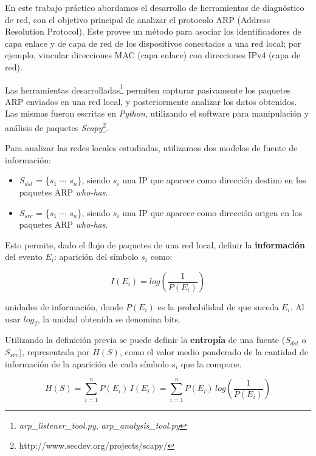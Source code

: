 En este trabajo práctico abordamos el desarrollo de herramientas de diagnóstico de red, con el objetivo principal de analizar el protocolo ARP (Address Resolution Protocol). Este provee un método para asociar los identificadores de capa enlace y de capa de red de los dispositivos conectados a una red local; por ejemplo, vincular direcciones MAC (capa enlace) con direcciones IPv4 (capa de red).

Las herramientas desarrolladas\footnote{\emph{arp\_listener\_tool.py}, \emph{arp\_analysis\_tool.py}} permiten capturar pasivamente los paquetes ARP enviados en una red local, y posteriormente analizar los datos obtenidos. Las mismas fueron escritas en \emph{Python}, utilizando el software para manipulación y análisis de paquetes \emph{Scapy}\footnote{http://www.secdev.org/projects/scapy/}.

Para analizar las redes locales estudiadas, utilizamos dos modelos de fuente de información:
\vspace*{-2mm}

\begin{itemize}
  \item $S_{dst}$ = \{$s_1$ $\cdots$ $s_n$\}, siendo $s_i$ una IP que aparece como dirección destino en los paquetes ARP \emph{who-has}.
  \item $S_{src}$ = \{$s_1$ $\cdots$ $s_n$\}, siendo $s_i$ una IP que aparece como dirección origen en los paquetes ARP \emph{who-has}.
\end{itemize}

Esto permite, dado el flujo de paquetes de una red local, definir la \textbf{información} del evento $E_i$: aparición del símbolo $s_i$ como:

$$I (E_i) = log\left(\frac{1}{P(E_i)}\right)$$

unidades de información, donde $P(E_i)$ es la probabilidad de que suceda $E_i$. Al usar $log_2$, la unidad obtenida se denomina bits.

Utilizando la definición previa se puede definir la \textbf{entropía} de una fuente ($S_{dst}$ o $S_{src}$), representada por $H(S)$, como el valor medio ponderado de la cantidad de información de la aparición de cada símbolo $s_i$ que la compone.

$$H(S) = \sum_{i=1}^{n} P(E_i)\,I(E_i) = \sum_{i=1}^{n} P(E_i)\,log\left(\frac{1}{P(E_i)}\right)$$